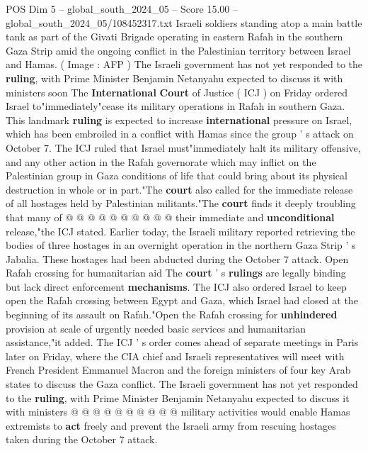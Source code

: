 \begin{textsample}{POS Dim 5 – global\_south\_2024\_05 – Score 15.00 – global\_south\_2024\_05/108452317.txt}  \label{ex:f5_pos_079}
Israeli soldiers standing atop a main battle tank as part of the Givati Brigade operating in eastern Rafah in the southern Gaza Strip amid the ongoing conflict in the Palestinian territory between Israel and Hamas. ( Image : AFP ) The Israeli government has not yet responded to the \textbf{ruling}, with Prime Minister Benjamin Netanyahu expected to discuss it with ministers soon The \textbf{International} \textbf{Court} of Justice ( ICJ ) on Friday ordered Israel to"immediately"cease its military operations in Rafah in southern Gaza.
This landmark \textbf{ruling} is expected to increase \textbf{international} pressure on Israel, which has been embroiled in a conflict with Hamas since the group ' s attack on October 7.
The ICJ ruled that Israel must"immediately halt its military offensive, and any other action in the Rafah governorate which may inflict on the Palestinian group in Gaza conditions of life that could bring about its physical destruction in whole or in part."The \textbf{court} also called for the immediate release of all hostages held by Palestinian militants."The \textbf{court} finds it deeply troubling that many of @ @ @ @ @ @ @ @ @ @ their immediate and \textbf{unconditional} release,"the ICJ stated.
Earlier today, the Israeli military reported retrieving the bodies of three hostages in an overnight operation in the northern Gaza Strip ' s Jabalia.
These hostages had been abducted during the October 7 attack.
Open Rafah crossing for humanitarian aid The \textbf{court} ' s \textbf{rulings} are legally binding but lack direct enforcement \textbf{mechanisms}.
The ICJ also ordered Israel to keep open the Rafah crossing between Egypt and Gaza, which Israel had closed at the beginning of its assault on Rafah."Open the Rafah crossing for \textbf{unhindered} provision at scale of urgently needed basic services and humanitarian assistance,"it added.
The ICJ ' s order comes ahead of separate meetings in Paris later on Friday, where the CIA chief and Israeli representatives will meet with French President Emmanuel Macron and the foreign ministers of four key Arab states to discuss the Gaza conflict.
The Israeli government has not yet responded to the \textbf{ruling}, with Prime Minister Benjamin Netanyahu expected to discuss it with ministers @ @ @ @ @ @ @ @ @ @ military activities would enable Hamas extremists to \textbf{act} freely and prevent the Israeli army from rescuing hostages taken during the October 7 attack.

\end{textsample}
